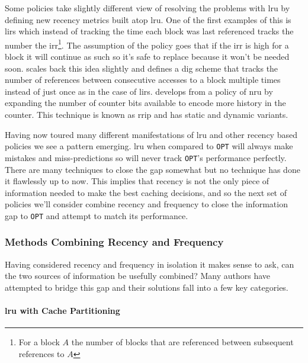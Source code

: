 Some policies take slightly different view of resolving the problems with \gls{lru} by defining new recency metrics built atop \gls{lru}. One of the first examples of this is \gls{lirs}\cite{jiangLIRSEfficientLow2002} which instead of tracking the time each block was last referenced tracks the number the \gls{irr}\footnote{For a block $A$ the number of blocks that are referenced between subsequent references to $A$}. The assumption of the policy goes that if the \gls{irr} is high for a block it will continue as such so it's safe to replace because it won't be needed soon. \citet{chooDIGDegreeInterreference2006} scales back this idea slightly and defines a \gls{dig} scheme that tracks the number of references between consecutive accesses to a block multiple times instead of just once as in the case of \gls{lirs}. \citet{jaleelHighPerformanceCache2010} develops from a policy of \gls{nru} by expanding the number of counter bits available to encode more history in the counter. This technique is known as \gls{rrip} and has static and dynamic variants. 

Having now toured many different manifestations of \gls{lru} and other recency based policies we see a pattern emerging. \gls{lru} when compared to \texttt{OPT} will always make mistakes and miss-predictions so will never track \texttt{OPT}'s performance perfectly. There are many techniques to close the gap somewhat but no technique has done it flawlessly up to now. This implies that recency is not the only piece of information needed to make the best caching decisions, and so the next set of policies we'll consider combine recency and frequency to close the information gap to \texttt{OPT} and attempt to match its performance.

\subsubsection{Methods Combining Recency and Frequency}

Having considered recency and frequency in isolation it makes sense to ask, can the two sources of information be usefully combined? Many authors have attempted to bridge this gap and their solutions fall into a few key categories. 

\paragraph{\gls{lru} with Cache Partitioning}

